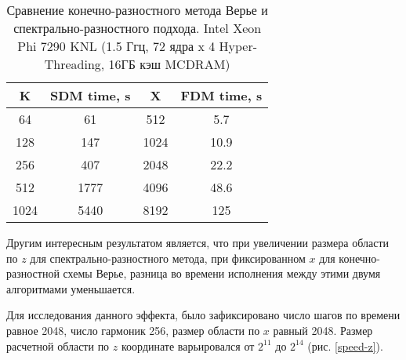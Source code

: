 \begin{center}
\begin{table}[h!]
\centering
  \begin{tabular}{|c|c|c|c|}
   \hline
	\textbf{K} &  \textbf{SDM time, s} & \textbf{X} & \textbf{FDM time, s} \\
	\hline
	64 &  61 & 512 & 5.7 \\
	\hline
	128 &  147 & 1024 & 10.9 \\
	\hline
	256 &  407 & 2048 & 22.2 \\
	\hline
	512 &  1777 & 4096 & 48.6 \\
	\hline
	1024 &  5440 & 8192 & 125 \\
  \hline 
  \end{tabular}
  \captionsetup{justification=centering}
  \caption{Сравнение конечно-разностного метода Верье и спектрально-разностного подхода. Intel Xeon Phi 7290 KNL (1.5 Ггц, 72 ядра x 4 Hyper-Threading, 16ГБ кэш MCDRAM)}\label{table}
\end{table}
\end{center}

Другим интересным результатом является, что при увеличении размера области по $z$ для спектрально-разностного метода, при фиксированном $x$ для конечно-разностной схемы Верье, разница во времени исполнения между этими двумя алгоритмами уменьшается.

Для исследования данного эффекта, было зафиксировано число шагов по времени равное 2048, число гармоник 256, размер области по $x$ равный 2048.
Размер расчетной области по $z$ координате варьировался от $2^{11}$ до $2^{14}$ (рис. \ref{speed-z}).


\clearpage
